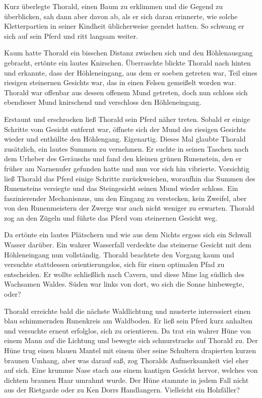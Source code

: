 Kurz überlegte Thorald, einen Baum zu erklimmen und die Gegend zu überblicken, sah dann aber davon ab, als er sich daran erinnerte, wie solche Kletterpartien in seiner Kindheit üblicherweise geendet hatten. So schwang er sich auf sein Pferd und ritt langsam weiter.

Kaum hatte Thorald ein bisschen Distanz zwischen sich und den Höhlenausgang gebracht, ertönte ein lautes Knirschen. Überraschte blickte Thorald nach hinten und erkannte, dass der Höhleneingang, aus dem er soeben getreten war, Teil eines riesigen steinernen Gesichts war, das in einen Felsen gemeißelt worden war. Thorald war offenbar aus dessen offenem Mund getreten, doch nun schloss sich ebendieser Mund knirschend und verschloss den Höhleneingang.

Erstaunt und erschrocken ließ Thorald sein Pferd näher treten. Sobald er einige Schritte vom Gesicht entfernt war, öffnete sich der Mund des riesigen Gesichts wieder und enthüllte den Höhlengang. Eigenartig. Dieses Mal glaubte Thorald zusätzlich, ein lautes Summen zu vernehmen. Er suchte in seinen Taschen nach dem Urheber des Geräuschs und fand den kleinen grünen Runenstein, den er früher am Narnenufer gefunden hatte und nun vor sich hin vibrierte. Vorsichtig ließ Thorald das Pferd einige Schritte zurückweichen, woraufhin das Summen des Runensteins versiegte und das Steingesicht seinen Mund wieder schloss. Ein faszinierender Mechanismus, um den Eingang zu verstecken, kein Zweifel, aber von den Runenmeistern der Zwerge war auch nicht weniger zu erwarten. Thorald zog an den Zügeln und führte das Pferd vom steinernen Gesicht weg.

Da ertönte ein lautes Plätschern und wie aus dem Nichts ergoss sich ein Schwall Wasser darüber. Ein wahrer Wasserfall verdeckte das steinerne Gesicht mit dem Höhleneingang nun vollständig. Thorald beachtete den Vorgang kaum und versuchte stattdessen orientierungslos, sich für einen optimalen Pfad zu entscheiden. Er wollte schließlich nach Cavern, und diese Mine lag südlich des Wachsamen Waldes. Süden war links von dort, wo sich die Sonne hinbewegte, oder?



\trennzeichen



Thorald erreichte bald die nächste Waldlichtung und musterte interessiert einen blau schimmernden Runenkreis am Waldboden. Er ließ sein Pferd kurz anhalten und versuchte erneut erfolglos, sich zu orientieren. Da trat ein wahrer Hüne von einem Mann auf die Lichtung und bewegte sich schnurstracks auf Thorald zu. Der Hüne trug einen blauen Mantel mit einem über seine Schultern drapierten kurzen braunen Umhang, aber was darauf saß, zog Thoralds Aufmerksamkeit viel eher auf sich. Eine krumme Nase stach aus einem kantigen Gesicht hervor, welches von dichtem braunen Haar umrahmt wurde. Der Hüne stammte in jedem Fall nicht aus der Rietgarde oder zu Ken Dorrs Handlangern. Vielleicht ein Holzfäller?

